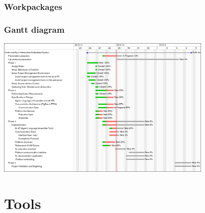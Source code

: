 \documentclass{beamer}
\theoremstyle{definition} \newtheorem{mdefinition}{Definition}
\theoremstyle{plain} \newtheorem{mtheorem}{Theorem}
\theoremstyle{plain} \newtheorem{mcorollary}{Corollary}
\theoremstyle{plain} \newtheorem{mfact}{Fact}
\begin{document}
\begin{frame}
	\frametitle{Workpackages}
\end{frame}


\begin{frame}
	\frametitle{Gantt diagram}

\begin{center}
\includegraphics[height=2.7in]{img/gantt}

\end{center}
\end{frame}

\section{Tools}
\end{document}
